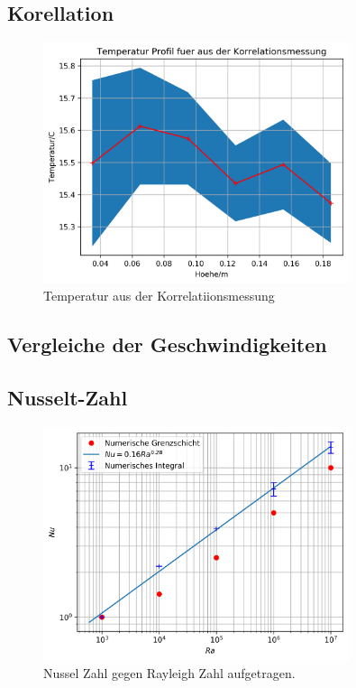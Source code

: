 \documentclass[12pt,a4paper,titlepage,headinclude]{scrartcl}
\numberwithin{equation}{subsection}
\begin{document}
\subsection{Korellation}

\begin{figure}[!ht]
\centering
\includegraphics[width=0.8\textwidth]{T_kor.png}
\caption{Temperatur aus der Korrelatiionsmessung}
\label{fig:T_kor}
\end{figure}





\subsection{Vergleiche der Geschwindigkeiten}

\subsection{Nusselt-Zahl}

\begin{figure}[!ht]
\centering
\includegraphics[width=0.8\textwidth]{Nu_Ra.png}
\caption{Nussel Zahl gegen Rayleigh Zahl aufgetragen.}
\label{fig:Nu_Ra}
\end{figure}
\end{document}
